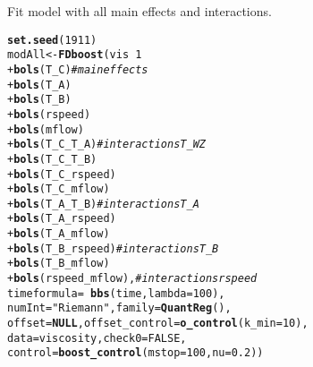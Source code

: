 \documentclass{article}\usepackage[]{graphicx}\usepackage[]{color}
\makeatletter
\newcommand{\hlnum}[1]{\textcolor[rgb]{0.686,0.059,0.569}{#1}}%
\newcommand{\hlstr}[1]{\textcolor[rgb]{0.192,0.494,0.8}{#1}}%
\newcommand{\hlcom}[1]{\textcolor[rgb]{0.678,0.584,0.686}{\textit{#1}}}%
\newcommand{\hlopt}[1]{\textcolor[rgb]{0,0,0}{#1}}%
\newcommand{\hlstd}[1]{\textcolor[rgb]{0.345,0.345,0.345}{#1}}%
\newcommand{\hlkwa}[1]{\textcolor[rgb]{0.161,0.373,0.58}{\textbf{#1}}}%
\newcommand{\hlkwb}[1]{\textcolor[rgb]{0.69,0.353,0.396}{#1}}%
\newcommand{\hlkwc}[1]{\textcolor[rgb]{0.333,0.667,0.333}{#1}}%
\newcommand{\hlkwd}[1]{\textcolor[rgb]{0.737,0.353,0.396}{\textbf{#1}}}%
\newenvironment{kframe}{%
 \def\at@end@of@kframe{}%
 \ifinner\ifhmode%
  \def\at@end@of@kframe{\end{minipage}}%
  \begin{minipage}{\columnwidth}%
 \fi\fi%
 \def\FrameCommand##1{\hskip\@totalleftmargin \hskip-\fboxsep
 \colorbox{shadecolor}{##1}\hskip-\fboxsep
     \hskip-\linewidth \hskip-\@totalleftmargin \hskip\columnwidth}%
 \MakeFramed {\advance\hsize-\width
   \@totalleftmargin\z@ \linewidth\hsize
   \@setminipage}}%
 {\par\unskip\endMakeFramed%
 \at@end@of@kframe}
\newenvironment{knitrout}{}{} %
\makeatother
\begin{document}
Fit model with all main effects and interactions. 

\begin{knitrout}
\color{fgcolor}\begin{kframe}
\begin{alltt}
\hlkwd{set.seed}\hlstd{(}\hlnum{1911}\hlstd{)}
\hlstd{modAll} \hlkwb{<-} \hlkwd{FDboost}\hlstd{(vis} \hlopt{~} \hlnum{1}
                  \hlopt{+} \hlkwd{bols}\hlstd{(T_C)} \hlcom{# main effects}
                  \hlopt{+} \hlkwd{bols}\hlstd{(T_A)}
                  \hlopt{+} \hlkwd{bols}\hlstd{(T_B)}
                  \hlopt{+} \hlkwd{bols}\hlstd{(rspeed)}
                  \hlopt{+} \hlkwd{bols}\hlstd{(mflow)}
                  \hlopt{+} \hlkwd{bols}\hlstd{(T_C_T_A)} \hlcom{# interactions T_WZ}
                  \hlopt{+} \hlkwd{bols}\hlstd{(T_C_T_B)}
                  \hlopt{+} \hlkwd{bols}\hlstd{(T_C_rspeed)}
                  \hlopt{+} \hlkwd{bols}\hlstd{(T_C_mflow)}
                  \hlopt{+} \hlkwd{bols}\hlstd{(T_A_T_B)} \hlcom{# interactions T_A}
                  \hlopt{+} \hlkwd{bols}\hlstd{(T_A_rspeed)}
                  \hlopt{+} \hlkwd{bols}\hlstd{(T_A_mflow)}
                  \hlopt{+} \hlkwd{bols}\hlstd{(T_B_rspeed)} \hlcom{# interactions T_B}
                  \hlopt{+} \hlkwd{bols}\hlstd{(T_B_mflow)}
                  \hlopt{+} \hlkwd{bols}\hlstd{(rspeed_mflow),} \hlcom{# interactions rspeed}
                  \hlkwc{timeformula}\hlstd{=}\hlopt{~}\hlkwd{bbs}\hlstd{(time,} \hlkwc{lambda}\hlstd{=}\hlnum{100}\hlstd{),}
                  \hlkwc{numInt}\hlstd{=}\hlstr{"Riemann"}\hlstd{,} \hlkwc{family}\hlstd{=}\hlkwd{QuantReg}\hlstd{(),}
                  \hlkwc{offset}\hlstd{=}\hlkwa{NULL}\hlstd{,} \hlkwc{offset_control} \hlstd{=} \hlkwd{o_control}\hlstd{(}\hlkwc{k_min} \hlstd{=} \hlnum{10}\hlstd{),}
                  \hlkwc{data}\hlstd{=viscosity,} \hlkwc{check0}\hlstd{=}\hlnum{FALSE}\hlstd{,}
                  \hlkwc{control}\hlstd{=}\hlkwd{boost_control}\hlstd{(}\hlkwc{mstop} \hlstd{=} \hlnum{100}\hlstd{,} \hlkwc{nu} \hlstd{=} \hlnum{0.2}\hlstd{))}
\end{alltt}
\end{kframe}
\end{knitrout}
\end{document}
